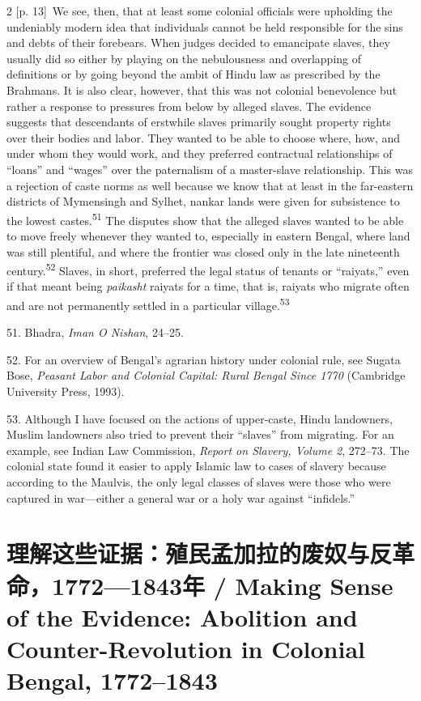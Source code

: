 \documentclass[10pt,a4paper]{article}
\begin{document}
\begin{paracol}{2}
\switchcolumn
{\scriptsize\color{gray} [p. 13]}\ We see, then, that at least some colonial officials were upholding the undeniably modern idea that individuals cannot be held responsible for the sins and debts of their forebears. When judges decided to emancipate slaves, they usually did so either by playing on the nebulousness and overlapping of definitions or by going beyond the ambit of Hindu law as prescribed by the Brahmans. It is also clear, however, that this was not colonial benevolence but rather a response to pressures from below by alleged slaves. The evidence suggests that descendants of erstwhile slaves primarily sought property rights over their bodies and labor. They wanted to be able to choose where, how, and under whom they would work, and they preferred contractual relationships of “loans” and “wages” over the paternalism of a master-slave relationship. This was a rejection of caste norms as well because we know that at least in the far-eastern districts of Mymensingh and Sylhet, nankar lands were given for subsistence to the lowest castes.\nobreak\textsuperscript{51} The disputes show that the alleged slaves wanted to be able to move freely whenever they wanted to, especially in eastern Bengal, where land was still plentiful, and where the frontier was closed only in the late nineteenth century.\nobreak\textsuperscript{52} Slaves, in short, preferred the legal status of tenants or “raiyats,” even if that meant being \textit{paikasht} raiyats for a time, that is, raiyats who migrate often and are not permanently settled in a particular village.\nobreak\textsuperscript{53}\par{\small 51. Bhadra, \textit{Iman O Nishan}, 24–25.\par}{\small 52. For an overview of Bengal’s agrarian history under colonial rule, see Sugata Bose, \textit{Peasant Labor and Colonial Capital: Rural Bengal Since 1770} (Cambridge University Press, 1993).\par}{\small 53. Although I have focused on the actions of upper-caste, Hindu landowners, Muslim landowners also tried to prevent their “slaves” from migrating. For an example, see Indian Law Commission, \textit{Report on Slavery, Volume 2}, 272–73. The colonial state found it easier to apply Islamic law to cases of slavery because according to the Maulvis, the only legal classes of slaves were those who were captured in war—either a general war or a holy war against “infidels.”\par}
\switchcolumn*
\end{paracol}
\section*{理解这些证据：殖民孟加拉的废奴与反革命，1772—1843年 / Making Sense of the Evidence: Abolition and Counter-Revolution in Colonial Bengal, 1772–1843}
\end{document}

